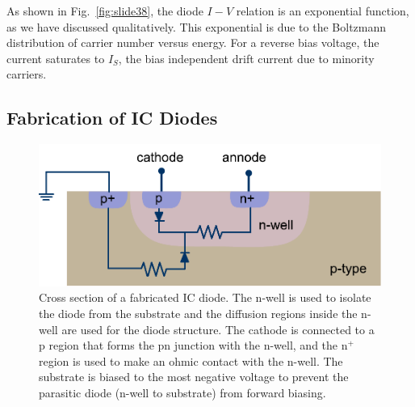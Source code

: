 As shown in Fig.~\ref{fig:slide38}, the diode $I-V$ relation is an exponential function, as we have discussed qualitatively.    This exponential is due to the Boltzmann distribution of carrier number versus energy.    For a reverse bias voltage,  the current saturates to $I_S$, the bias independent drift current due to minority carriers.
 

\subsection{Fabrication of IC Diodes}

\begin{figure}[tb]
\begin{center}
\includegraphics[width=.65\columnwidth]{slide44}
\end{center}
\caption{Cross section of a fabricated IC diode.  The n-well is used to isolate the diode from the substrate and the diffusion regions inside the n-well are used for the diode structure.  The cathode is connected to a p region that forms the pn junction with the n-well, and the n$^+$ region is used to make an ohmic contact with the n-well.  The substrate is biased to the most negative voltage to prevent the parasitic diode (n-well to substrate) from forward biasing.  } \label{fig:slide44}
\end{figure}

